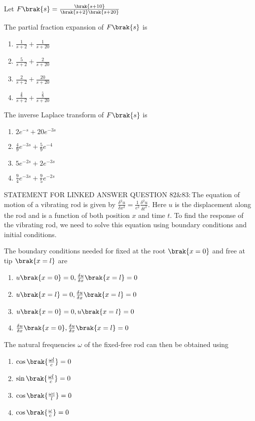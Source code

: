     Let $F\brak{s}=\frac{\brak{s+10}}{\brak{s+2}\brak{s+20}}$
    \item The partial fraction expansion of $F\brak{s}$ is
    \begin{enumerate}
        \item $\frac{1}{s+2}+\frac{1}{s+20}$
        \item $\frac{5}{s+2}+\frac{2}{s+20}$
        \item $\frac{2}{s+2}+\frac{20}{s+20}$
        \item $\frac{\frac{4}{9}}{s+2}+\frac{\frac{5}{9}}{s+20}$
    \end{enumerate}
    \item The inverse Laplace transform of $F\brak{s}$ is
    \begin{enumerate}
        \item $2e^{-s}+20e^{-3s}$
        \item $\frac{4}{9}e^{-3s}+\frac{5}{9}e^{-4}$
        \item $5e^{-2s}+2e^{-3s}$
        \item $\frac{9}{4}e^{-3s}+\frac{9}{5}e^{-2s}$
    \end{enumerate}
    STATEMENT FOR LINKED ANSWER QUESTION $82\&83:$The equation of motion of a vibrating rod is given by $\frac{\delta^2 u}{\delta x^2}=\frac{1}{e^2}\frac{\delta^2 u}{\delta t^2}.$ Here $u$ is the displacement along the rod and is a function of both position $x$ and time $t$. To find the response of the vibrating rod, we need to solve this equation using boundary conditions and initial conditions.
    \item The boundary conditions needed for fixed at the root $\brak{x=0}$ and free at tip $\brak{x=l}$ are
    \begin{enumerate}
        \item $u\brak{x=0}=0,\frac{\delta u}{\delta x}\brak{x=l}=0$
        \item $u\brak{x=l}=0,\frac{\delta u}{\delta x}\brak{x=l}=0$
        \item $u\brak{x=0}=0,u\brak{x=l}=0$
      \item $\frac{\delta u}{\delta x}\brak{x=0},\frac{\delta u}{\delta x}\brak{x=l}=0$
    \end{enumerate}
    \item The natural frequencies $\omega$ of the fixed-free rod can then be obtained using
    \begin{enumerate}
        \item $\cos\brak{\frac{\omega l}{c}}=0$
        \item $\sin\brak{\frac{\omega l}{c}}=0$
        \item $\cos\brak{\frac{\omega c}{l}}=0$
        \item $\cos\brak{\frac{\omega }{c}}=0$
    \end{enumerate}
